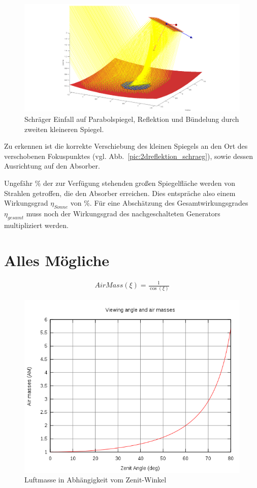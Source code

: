 \documentclass[fontsize=10pt,paper=a4,bibliography=totoc]{scrartcl}
\begin{document}
\begin{figure}[htb]
	\centering
	\includegraphics[width=\textwidth]{images/netteReflektion}
	\caption[Bündelung schräg]{Schräger Einfall auf Parabolspiegel, Reflektion und Bündelung durch zweiten kleineren Spiegel.}
	\label{pic:netteReflektion}
\end{figure}

Zu erkennen ist die korrekte Verschiebung des kleinen Spiegels an den Ort des verschobenen Fokuspunktes (vgl. Abb.~\ref{pic:2dreflektion_schraeg}), sowie dessen Ausrichtung auf den Absorber.

Ungefähr \unit[40]{\%} der zur Verfügung stehenden großen Spiegelfläche werden von Strahlen getroffen, die den Absorber erreichen. Dies entspräche also einem Wirkungsgrad $\eta_{Sonne}$ von \unit[40]{\%}. Für eine Abschätzung des Gesamtwirkungsgrades $\eta_{gesamt}$ muss noch der Wirkungsgrad des nachgeschalteten Generators multipliziert werden.

\section{Alles Mögliche}

\begin{align*}
	AirMass(\xi)=\frac{1}{\cos(\xi)}
\end{align*}

\begin{figure}[htb]
	\centering
	\includegraphics[width=\textwidth]{images/Airmass.png}
	\caption{Luftmasse in Abhängigkeit vom Zenit-Winkel}
	\label{pic:AirMass}
\end{figure}
\end{document}
